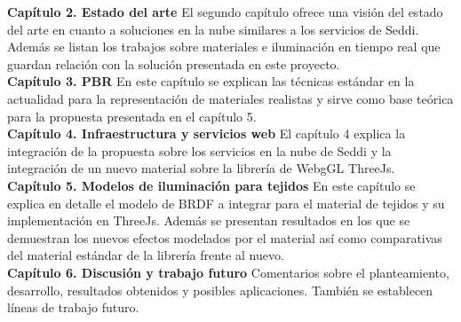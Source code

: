 \textbf{Cap\'itulo 2. Estado del arte}
El segundo cap\'itulo ofrece una visi\'on del estado del arte en cuanto a soluciones en la nube similares a los servicios
de Seddi. Adem\'as se listan los trabajos sobre materiales e iluminaci\'on en tiempo real que guardan relaci\'on con la
soluci\'on presentada en este proyecto.\\

\textbf{Cap\'itulo 3. PBR}
En este cap\'itulo se explican las t\'ecnicas est\'andar en la actualidad para la representaci\'on de materiales realistas y
sirve como base te\'orica para la propuesta presentada en el cap\'itulo 5.\\

\textbf{Cap\'itulo 4. Infraestructura y servicios web}
El cap\'itulo 4 explica la integraci\'on de la propuesta sobre los servicios en la nube de Seddi y la integraci\'on de un nuevo material
sobre la librer\'ia de WebgGL ThreeJs.\\

\textbf{Cap\'itulo 5. Modelos de iluminaci\'on para tejidos}
En este cap\'itulo se explica en detalle el modelo de BRDF a integrar para el material de tejidos y su implementaci\'on en ThreeJs.
Adem\'as se presentan resultados en los que se demuestran los nuevos efectos modelados por el material as\'i como comparativas
del material est\'andar de la librer\'ia frente al nuevo.\\

\textbf{Cap\'itulo 6. Discusi\'on y trabajo futuro}
Comentarios sobre el planteamiento, desarrollo, resultados obtenidos y posibles aplicaciones. Tambi\'en se establecen
l\'ineas de trabajo futuro.
